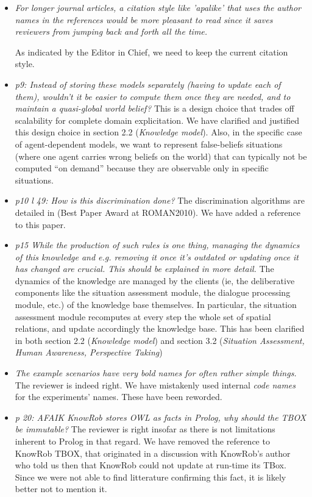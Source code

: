 \documentclass{article}
\begin{document}
\begin{itemize}

    \item \emph{For longer journal articles, a citation style like 'apalike' that uses the
author names in the references would be more pleasant to read since it saves
reviewers from jumping back and forth all the time.}

As indicated by the Editor in Chief, we need to keep the current citation style.

    \item \emph{p9: Instead of storing these models separately (having to
    update each
of them), wouldn't it be easier to compute them once they are needed, and
to maintain a quasi-global world belief?} This is a design choice that trades
off scalability for complete domain explicitation. We have clarified and
justified this design choice in section 2.2 (\emph{Knowledge model}). Also, in
the specific case of agent-dependent models, we want to represent
false-beliefs situations (where one agent carries wrong beliefs on the world)
that can typically not be computed ``on demand'' because they are observable
only in specific situations.

    \item \emph{p10 l 49: How is this discrimination done?} The discrimination
        algorithms are detailed in \cite{Ros2010b} (Best Paper Award at
        ROMAN2010). We have added a reference to this paper.

    \item \emph{p15 While the production of such rules is one thing, managing the
    dynamics of this knowledge and e.g. removing it once it's outdated or updating
once it has changed are crucial. This should be explained in more detail.}
The dynamics of the knowledge are managed by the clients (ie, the deliberative
components like the situation assessment module, the dialogue processing module,
etc.) of the knowledge base themselves. In particular, the situation assessment
module recomputes at every step the whole set of spatial relations, and update
accordingly the knowledge base. This has been clarified in both section 2.2
(\emph{Knowledge model}) and section 3.2 (\emph{Situation Assessment, Human
Awareness, Perspective Taking})

    \item \emph{The example scenarios have very bold names for often rather
        simple things.} The reviewer is indeed right. We have mistakenly used internal
        \emph{code names} for the experiments' names. These have been reworded.

    \item \emph{p 20: AFAIK KnowRob stores OWL as facts in Prolog, why
        should the TBOX be immutable?} The reviewer is right insofar as there is
        not limitations inherent to Prolog in that regard. We have removed the
        reference to KnowRob TBOX, that originated in a discussion with KnowRob's author who told
        us then that KnowRob could not update at run-time its TBox. Since we were
        not able to find litterature confirming this fact, it is likely better
        not to mention it.

\end{itemize}
\end{document}
